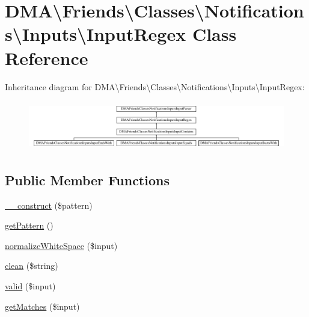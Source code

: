 \hypertarget{classDMA_1_1Friends_1_1Classes_1_1Notifications_1_1Inputs_1_1InputRegex}{}\section{D\+M\+A\textbackslash{}Friends\textbackslash{}Classes\textbackslash{}Notifications\textbackslash{}Inputs\textbackslash{}Input\+Regex Class Reference}
\label{classDMA_1_1Friends_1_1Classes_1_1Notifications_1_1Inputs_1_1InputRegex}
Inheritance diagram for D\+M\+A\textbackslash{}Friends\textbackslash{}Classes\textbackslash{}Notifications\textbackslash{}Inputs\textbackslash{}Input\+Regex\+:\begin{figure}[H]
\begin{center}
\leavevmode
\includegraphics[height=2.189638cm]{d2/ddc/classDMA_1_1Friends_1_1Classes_1_1Notifications_1_1Inputs_1_1InputRegex}
\end{center}
\end{figure}
\subsection*{Public Member Functions}
\begin{DoxyCompactItemize}
\item 
\hyperlink{classDMA_1_1Friends_1_1Classes_1_1Notifications_1_1Inputs_1_1InputRegex_a1ea4c6e30bbc382309c1f1017987c8b2}{\+\_\+\+\_\+construct} (\$pattern)
\item 
\hyperlink{classDMA_1_1Friends_1_1Classes_1_1Notifications_1_1Inputs_1_1InputRegex_aed805000bc2c0a834aceaf9d85c71fc8}{get\+Pattern} ()
\item 
\hyperlink{classDMA_1_1Friends_1_1Classes_1_1Notifications_1_1Inputs_1_1InputRegex_a87c7a6e72f48818f6465383ef4cad906}{normalize\+White\+Space} (\$input)
\item 
\hyperlink{classDMA_1_1Friends_1_1Classes_1_1Notifications_1_1Inputs_1_1InputRegex_ae8e42c1634199a9282f2f43b896d5e3e}{clean} (\$string)
\item 
\hyperlink{classDMA_1_1Friends_1_1Classes_1_1Notifications_1_1Inputs_1_1InputRegex_af11f65b800a7205d741237f349444188}{valid} (\$input)
\item 
\hyperlink{classDMA_1_1Friends_1_1Classes_1_1Notifications_1_1Inputs_1_1InputRegex_a8354c3ab987a442631c2dffee6b807cd}{get\+Matches} (\$input)
\end{DoxyCompactItemize}
